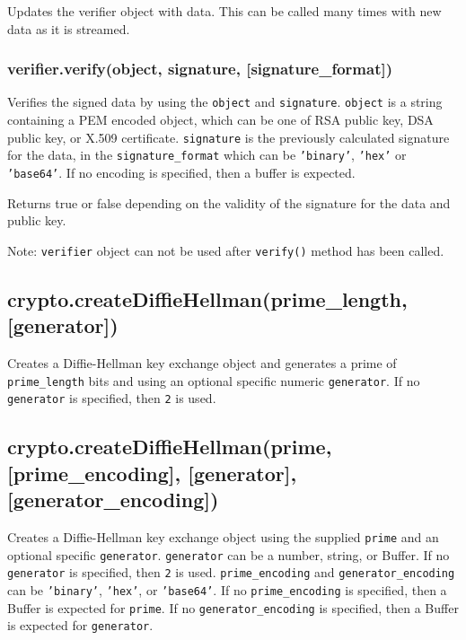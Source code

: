 Updates the verifier object with data. This can be called many times
with new data as it is streamed.

\subsubsection{verifier.verify(object, signature,
{[}signature\_format{]})}\label{verifier.verifyobject-signature-signatureux5fformat}

Verifies the signed data by using the \texttt{object} and
\texttt{signature}. \texttt{object} is a string containing a PEM encoded
object, which can be one of RSA public key, DSA public key, or X.509
certificate. \texttt{signature} is the previously calculated signature
for the data, in the \texttt{signature\_format} which can be
\texttt{'binary'}, \texttt{'hex'} or \texttt{'base64'}. If no encoding
is specified, then a buffer is expected.

Returns true or false depending on the validity of the signature for the
data and public key.

Note: \texttt{verifier} object can not be used after \texttt{verify()}
method has been called.

\subsection{crypto.createDiffieHellman(prime\_length,
{[}generator{]})}\label{crypto.creatediffiehellmanprimeux5flength-generator}

Creates a Diffie-Hellman key exchange object and generates a prime of
\texttt{prime\_length} bits and using an optional specific numeric
\texttt{generator}. If no \texttt{generator} is specified, then
\texttt{2} is used.

\subsection{crypto.createDiffieHellman(prime, {[}prime\_encoding{]},
{[}generator{]},
{[}generator\_encoding{]})}\label{crypto.creatediffiehellmanprime-primeux5fencoding-generator-generatorux5fencoding}

Creates a Diffie-Hellman key exchange object using the supplied
\texttt{prime} and an optional specific \texttt{generator}.
\texttt{generator} can be a number, string, or Buffer. If no
\texttt{generator} is specified, then \texttt{2} is used.
\texttt{prime\_encoding} and \texttt{generator\_encoding} can be
\texttt{'binary'}, \texttt{'hex'}, or \texttt{'base64'}. If no
\texttt{prime\_encoding} is specified, then a Buffer is expected for
\texttt{prime}. If no \texttt{generator\_encoding} is specified, then a
Buffer is expected for \texttt{generator}.

